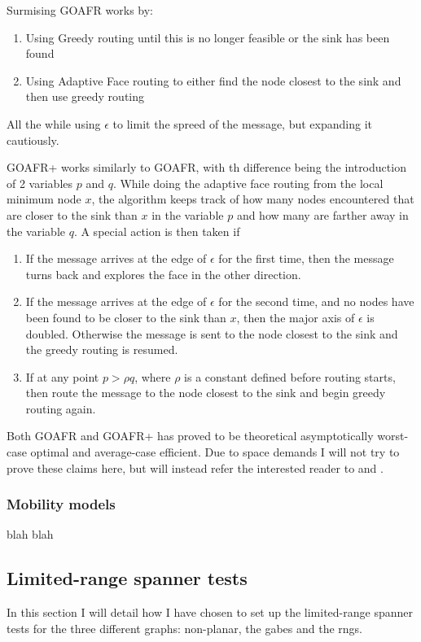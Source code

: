 Surmising GOAFR works by:
\begin{enumerate}
\item Using Greedy routing until this is no longer feasible or the sink has been found
\item Using Adaptive Face routing to either find the node closest to the sink and then use greedy routing
\end{enumerate}
All the while using $\epsilon$ to limit the spreed of the message, but expanding it cautiously.

GOAFR+ works similarly to GOAFR, with th difference being the introduction of 2 variables $p$ and $q$. While doing the adaptive face routing from the local minimum node $x$, the algorithm keeps track of how many nodes encountered that are closer to the sink than $x$ in the variable $p$ and how many are farther away in the variable $q$.
A special action is then taken if
\begin{enumerate}
\item If the message arrives at the edge of $\epsilon$ for the first time, then the message turns back and explores the face in the other direction. 
\item If the message arrives at the edge of $\epsilon$ for the second time, and no nodes have been found to be closer to the sink than $x$, then the major axis of $\epsilon$ is doubled. Otherwise the message is sent to the node closest to the sink and the greedy routing is resumed.
\item If at any point $p > \rho q$, where $\rho$ is a constant defined before routing starts, then route the message to the node closest to the sink and begin greedy routing again.
\end{enumerate}

Both GOAFR and GOAFR+ has proved to be theoretical asymptotically worst-case optimal and average-case efficient. Due to space demands I will not try to prove these claims here, but will instead refer the interested reader to \cite{gopher+} and \cite{gopher}.

\subsubsection{Mobility models}


blah blah



\subsection{Limited-range spanner tests}
\label{section:test_desc_spanners}
In this section I will detail how I have chosen to set up the limited-range spanner tests for the three different graphs: non-planar, the \acp{gabe} and the \acp{rng}.

